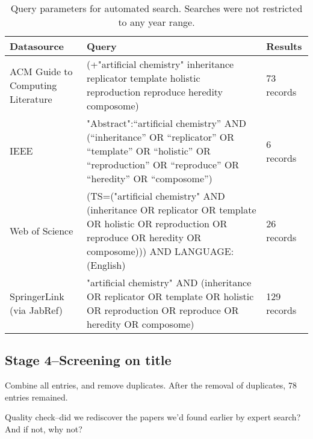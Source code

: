 \begin{table*}
	\footnotesize
	\begin{center}
		\begin{tabular}{@{}lp{8cm}p{2cm}@{}}
			\toprule
			Datasource & Query & Results\\
			\midrule
			ACM Guide to Computing Literature & (+"artificial chemistry" inheritance replicator template holistic reproduction reproduce heredity composome)&73 records\\
			\midrule
			IEEE & "Abstract":“artificial chemistry” AND (“inheritance” OR “replicator” OR “template” OR “holistic” OR “reproduction” OR “reproduce” OR “heredity” OR “composome”)&6 records  \\
			\midrule
			Web of Science & (TS=("artificial chemistry" AND (inheritance OR replicator OR template OR holistic OR reproduction OR reproduce OR heredity OR composome))) AND LANGUAGE: (English)&26 records\\
			\midrule
			SpringerLink (via JabRef) &"artificial chemistry" AND (inheritance OR replicator OR template OR holistic OR reproduction OR reproduce OR heredity OR composome) & 129 records\\ 
			\bottomrule
		\end{tabular}
	\end{center}
	\caption{Query parameters for automated search. Searches were not restricted to any year range.}
\end{table*}

\subsection{Stage 4--Screening on title}

Combine all entries, and remove duplicates. After the removal of duplicates, 78 entries remained.

Quality check--did we rediscover the papers we'd found earlier by expert search? And if not, why not?

